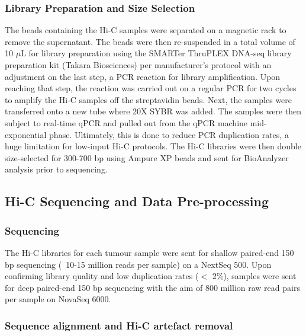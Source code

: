 \subsubsection{Library Preparation and Size Selection}

The beads containing the Hi-C samples were separated on a magnetic rack to remove the supernatant.
The beads were then re-suspended in a total volume of 10 $\mu$L for library preparation using the SMARTer ThruPLEX DNA-seq library preparation kit (Takara Biosciences) per manufacturer's protocol with an adjustment on the last step, a PCR reaction for library amplification.
Upon reaching that step, the reaction was carried out on a regular PCR for two cycles to amplify the Hi-C samples off the streptavidin beads.
Next, the samples were transferred onto a new tube where 20X SYBR was added.
The samples were then subject to real-time qPCR and pulled out from the qPCR machine mid-exponential phase.
Ultimately, this is done to reduce PCR duplication rates, a huge limitation for low-input Hi-C protocols.
The Hi-C libraries were then double size-selected for 300-700 bp using Ampure XP beads and sent for BioAnalyzer analysis prior to sequencing.

\subsection{Hi-C Sequencing and Data Pre-processing}

\subsubsection{Sequencing}

The Hi-C libraries for each tumour sample were sent for shallow paired-end 150 bp sequencing (~10-15 million reads per sample) on a NextSeq 500.
Upon confirming library quality and low duplication rates ($<$ 2\%), samples were sent for deep paired-end 150 bp sequencing with the aim of 800 million raw read pairs per sample on NovaSeq 6000.

\subsubsection{Sequence alignment and Hi-C artefact removal}


